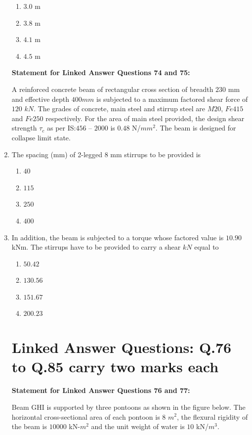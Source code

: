 \documentclass[journal]{IEEEtran}
\begin{document}
\begin{enumerate}
\begin{enumerate}
\item $3.0$ m
\item $3.8$ m
\item $4.1$ m
\item $4.5$ m
\end{enumerate}



\textbf{Statement for Linked Answer Questions 74 and 75:}

A reinforced concrete beam of rectangular cross section of breadth $230$ mm and effective depth $400 mm$ is subjected to a maximum factored shear force of $120$ $kN$. The grades of concrete, main steel and stirrup steel are $M20$, $Fe415$ and $Fe250$ respectively. For the area of main steel provided, the design shear strength $\tau_c$ as per IS:$456$ --  $2000$ is $0.48$ N/$mm^{2}$. The beam is designed for collapse limit state.



\item The spacing (mm) of 2-legged 8 mm stirrups to be provided is \hfill {}
\begin{enumerate}
\item $40$
\item $115$
\item $250$
\item $400$
\end{enumerate}



\item  In addition, the beam is subjected to a torque whose factored value is $10.90$ kNm. The stirrups have to be provided to carry a shear $kN$ equal to \hfill {}
\begin{enumerate}
\item $50.42$
\item $130.56$
\item $151.67$
\item $200.23$
\end{enumerate}

\section*{Linked Answer Questions: Q.76 to Q.85 carry two marks each}

\textbf{Statement for Linked Answer Questions 76 and 77:}

Beam GHI is supported by three pontoons as shown in the figure below. The horizontal cross-sectional area of each pontoon is $8$ $m^{2}$, the flexural rigidity of the beam is $10000$ kN-$m^{2}$ and the unit weight of water is $10$ kN/$m^{3}$.



\end{enumerate}
\end{document}
